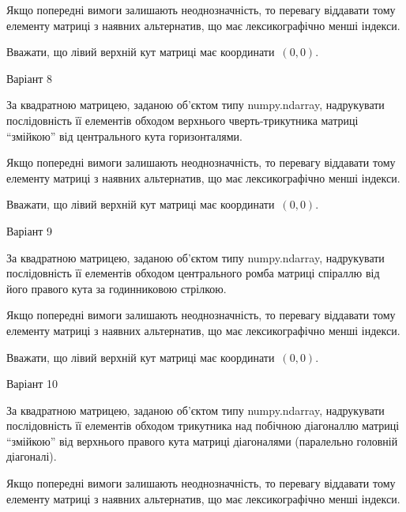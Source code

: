 \documentclass[11pt]{article}
\begin{document}
\vspace{2mm}
Якщо попередні вимоги залишають неоднозначність, то перевагу віддавати тому елементу матриці з наявних альтернатив, що має лексикографічно менші індекси.

Вважати, що лівий верхній кут матриці має координати~$(0,0)$.



{\Large \center  Варіант  8\par \bigskip\bigskip}

За квадратною матрицею, заданою об'єктом типу numpy.ndarray, надрукувати послідовність її елементів обходом верхнього чверть-трикутника матриці ``змійкою'' від центрального кута горизонталями.

\vspace{2mm}
Якщо попередні вимоги залишають неоднозначність, то перевагу віддавати тому елементу матриці з наявних альтернатив, що має лексикографічно менші індекси.

Вважати, що лівий верхній кут матриці має координати~$(0,0)$.



{\Large \center  Варіант  9\par \bigskip\bigskip}

За квадратною матрицею, заданою об'єктом типу numpy.ndarray, надрукувати послідовність її елементів обходом центрального ромба матриці спіраллю від його правого кута за годинниковою стрілкою.

\vspace{2mm}
Якщо попередні вимоги залишають неоднозначність, то перевагу віддавати тому елементу матриці з наявних альтернатив, що має лексикографічно менші індекси.

Вважати, що лівий верхній кут матриці має координати~$(0,0)$.



{\Large \center  Варіант  10\par \bigskip\bigskip}

За квадратною матрицею, заданою об'єктом типу numpy.ndarray, надрукувати послідовність її елементів обходом трикутника над побічною діагоналлю матриці ``змійкою'' від верхнього правого кута матриці діагоналями (паралельно головній діагоналі).

\vspace{2mm}
Якщо попередні вимоги залишають неоднозначність, то перевагу віддавати тому елементу матриці з наявних альтернатив, що має лексикографічно менші індекси.
\end{document}
